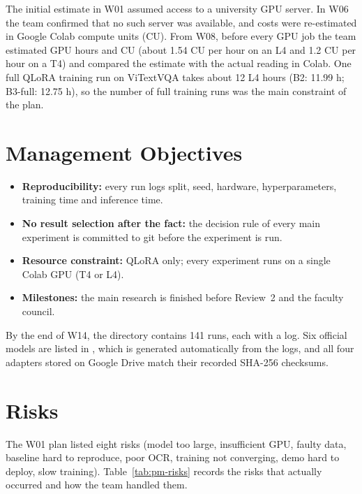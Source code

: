 The initial estimate in W01 assumed access to a university GPU server. In W06
the team confirmed that no such server was available, and costs were
re-estimated in Google Colab compute units (CU). From W08, before every GPU job
the team estimated GPU hours and CU (about 1.54 CU per hour on an L4 and 1.2 CU
per hour on a T4) and compared the estimate with the actual reading in Colab.
One full QLoRA training run on ViTextVQA takes about 12 L4 hours (B2: 11.99 h;
B3-full: 12.75 h), so the number of full training runs was the main constraint
of the plan.

\section{Management Objectives}

\begin{itemize}
  \item \textbf{Reproducibility:} every run logs split, seed, hardware,
  hyperparameters, training time and inference time.
  \item \textbf{No result selection after the fact:} the decision rule of every
  main experiment is committed to git before the experiment is run.
  \item \textbf{Resource constraint:} QLoRA only; every experiment runs on a
  single Colab GPU (T4 or L4).
  \item \textbf{Milestones:} the main research is finished before Review~2 and
  the faculty council.
\end{itemize}

By the end of W14, the  directory contains 141 runs, each
with a log. Six official models are listed in
, which is generated automatically from
the logs, and all four adapters stored on Google Drive match their recorded
SHA-256 checksums.

\section{Risks}

The W01 plan listed eight risks (model too large, insufficient GPU, faulty data,
baseline hard to reproduce, poor OCR, training not converging, demo hard to
deploy, slow training). Table~\ref{tab:pm-risks} records the risks that actually
occurred and how the team handled them.

